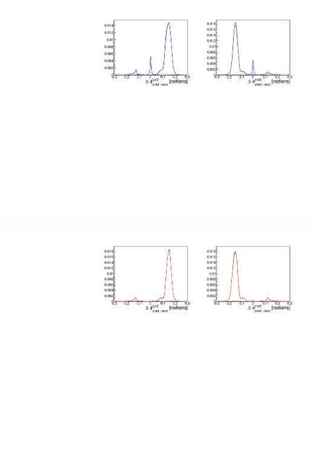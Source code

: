 \documentclass[8pt]{beamer}
\begin{document}
\begin{frame}
	\includegraphics[width=\textwidth]{VBilder/cb2b}

	\includegraphics[width=\textwidth]{VBilder/cb2bMC}
\end{frame}
\end{document}
